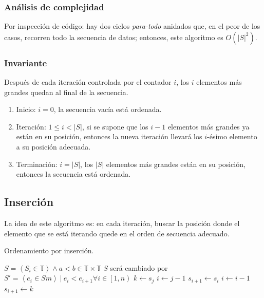 \documentclass[letter]{article}
\begin{document}
\subsubsection{Análisis de complejidad} \label{algoritmos:mejorado:complejidad}

Por inspección de código: hay dos ciclos {\it para-todo} anidados que, en el peor de los casos, recorren todo la secuencia de datos; entonces, este algoritmo es $O(|S|^2)$.

\subsubsection{Invariante} \label{algoritmos:mejorado:invariante}

Después de cada iteración controlada por el contador $i$, los $i$ elementos más grandes quedan al final de la secuencia.

\begin{enumerate}
    \item Inicio: $i=0$, la secuencia vacía está ordenada.
    \item Iteración: $1 \le i<|S|$, si se supone que los $i-1$ elementos más grandes ya están en su posición, entonces la nueva iteración llevará los $i$-ésimo elemento a su posición adecuada.
    \item Terminación: $i=|S|$, los $|S|$ elementos más grandes están en su posición, entonces la secuencia está ordenada.
\end{enumerate}

\subsection{Inserción} \label{algoritmos:insercion}

La idea de este algoritmo es: en cada iteración, buscar la posición donde el elemento que se está iterando quede en el orden de secuencia adecuado.

\begin{algorithm}[!htb]
\caption{Ordenamiento por inserción.}
\begin{algorithmic}[1]
\Require $S=\left< S_i \in \mathbb{T} \right> \land a<b \in \mathbb{T} \times \mathbb{T}$
\Ensure $S$ será cambiado por $S' = \left< e_i \in S m\right> ~ | ~ e_i < e_{i+1} \forall i \in \left[1,n\right)$
    \State $k \leftarrow s_j$
    \State $i \leftarrow j - 1$
      \State $s_{i+1} \leftarrow s_i$
      \State $i \leftarrow i - 1$
    \EndWhile
    \State $s_{i+1} \leftarrow k$
  \EndFor
\EndProcedure
\end{algorithmic}
\end{algorithm}
\end{document}
